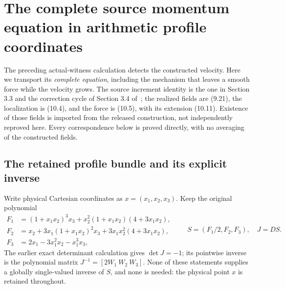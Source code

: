 \section{The complete source momentum equation in arithmetic profile coordinates}
\label{sec:ns-stress-arithmetic}

The preceding actual-witness calculation detects the constructed velocity.
Here we transport its \emph{complete equation}, including the mechanism
that leaves a smooth force while the velocity grows. The source increment
identity is the one in Section 3.3 and the correction cycle of Section 3.4
of~\cite{openaiNS2026release}; the realized fields are (9.21), the
localization is (10.4), and the force is (10.5), with its extension (10.11).
Existence of those fields is imported from the released construction,
not independently reproved here. Every correspondence below is proved
directly, with no averaging of the constructed fields.

\subsection{The retained profile bundle and its explicit inverse}

Write physical Cartesian coordinates as \(x=(x_1,x_2,x_3)\). Keep the
original polynomial
\[
\begin{split}
 F_1&=(1+x_1x_2)^3x_3+x_2^2(1+x_1x_2)(4+3x_1x_2),\\
 F_2&=x_2+3x_1(1+x_1x_2)^2x_3+3x_1x_2^2(4+3x_1x_2),\\
 F_3&=2x_1-3x_1^2x_2-x_1^3x_3,
\end{split}
\qquad
 S=(F_1/2,F_2,F_3),\quad J=DS .
\]
The earlier exact determinant calculation gives \(\det J=-1\);
its pointwise inverse is the polynomial matrix
\(J^{-1}=[2W_1\ W_2\ W_3]\). None of these statements supplies
a globally single-valued inverse of \(S\), and none is needed:
the physical point \(x\) is retained throughout.

